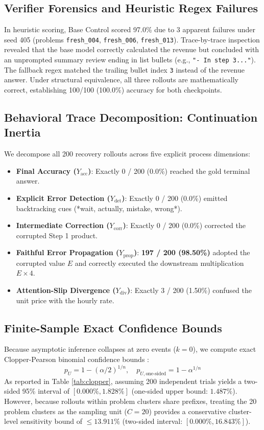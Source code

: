 \documentclass[10pt,conference]{IEEEtran}
\begin{document}
\subsection{Verifier Forensics and Heuristic Regex Failures}
In heuristic scoring, Base Control scored 97.0\% due to 3 apparent failures under seed 405 (problems \texttt{fresh\_004}, \texttt{fresh\_006}, \texttt{fresh\_013}). Trace-by-trace inspection revealed that the base model correctly calculated the revenue but concluded with an unprompted summary review ending in list bullets (e.g., \texttt{"- In step 3..."}). The fallback regex matched the trailing bullet index \texttt{3} instead of the revenue answer. Under structural equivalence, all three rollouts are mathematically correct, establishing 100/100 (100.0\%) accuracy for both checkpoints.

\subsection{Behavioral Trace Decomposition: Continuation Inertia}
We decompose all 200 recovery rollouts across five explicit process dimensions:
\begin{itemize}
    \item \textbf{Final Accuracy ($Y_{\text{acc}}$)}: Exactly 0 / 200 (0.0\%) reached the gold terminal answer.
    \item \textbf{Explicit Error Detection ($Y_{\text{det}}$)}: Exactly 0 / 200 (0.0\%) emitted backtracking cues (*wait, actually, mistake, wrong*).
    \item \textbf{Intermediate Correction ($Y_{\text{corr}}$)}: Exactly 0 / 200 (0.0\%) corrected the corrupted Step 1 product.
    \item \textbf{Faithful Error Propagation ($Y_{\text{prop}}$)}: \textbf{197 / 200 (98.50\%)} adopted the corrupted value $E$ and correctly executed the downstream multiplication $E \times 4$.
    \item \textbf{Attention-Slip Divergence ($Y_{\text{div}}$)}: Exactly 3 / 200 (1.50\%) confused the unit price with the hourly rate.
\end{itemize}

\subsection{Finite-Sample Exact Confidence Bounds}
Because asymptotic inference collapses at zero events ($k=0$), we compute exact Clopper-Pearson binomial confidence bounds \cite{clopper1934use}:
$$p_U = 1 - (\alpha/2)^{1/n}, \quad p_{U, \text{one-sided}} = 1 - \alpha^{1/n}$$
As reported in Table \ref{tab:clopper}, assuming 200 independent trials yields a two-sided 95\% interval of $[0.000\%, 1.828\%]$ (one-sided upper bound: $1.487\%$). However, because rollouts within problem clusters share prefixes, treating the 20 problem clusters as the sampling unit ($C=20$) provides a conservative cluster-level sensitivity bound of $\le 13.911\%$ (two-sided interval: $[0.000\%, 16.843\%]$).
\end{document}
